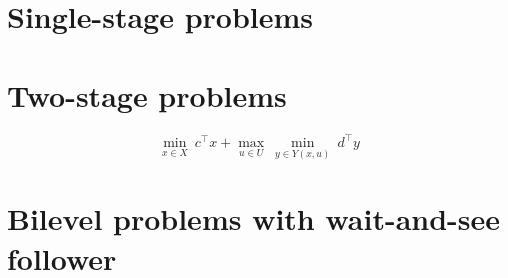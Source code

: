 \section{Single-stage problems}

\section{Two-stage problems}

\begin{equation*}
    \min_{x\in X} \ c^\top x + \max_{ u\in U } \ \min_{y\in Y(x,u)} \ d^\top y
\end{equation*}

\section{Bilevel problems with wait-and-see follower}
